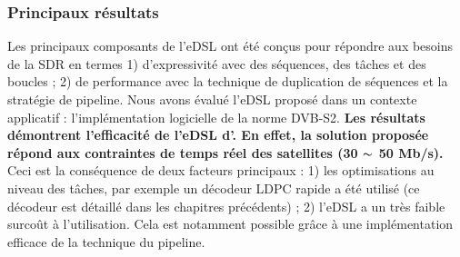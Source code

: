 \subsubsection*{Principaux résultats}

Les principaux composants de l'eDSL ont été conçus pour répondre aux besoins de
la SDR en termes 1) d'expressivité avec des séquences, des tâches et des
boucles ; 2) de performance avec la technique de duplication de séquences et la
stratégie de pipeline. Nous avons évalué l'eDSL proposé dans un contexte
applicatif : l'implémentation logicielle de la norme DVB-S2. \textbf{Les
résultats démontrent l'efficacité de l'eDSL d'\AFFECT. En effet, la solution
proposée répond aux contraintes de temps réel des satellites (30 $\thicksim$
50 Mb/s).} Ceci est la conséquence de deux facteurs principaux : 1) les
optimisations au niveau des tâches, par exemple un décodeur LDPC rapide a été
utilisé (ce décodeur est détaillé dans les chapitres précédents) ; 2) l'eDSL a
un très faible surcoût à l'utilisation. Cela est notamment possible grâce à une
implémentation efficace de la technique du pipeline.
